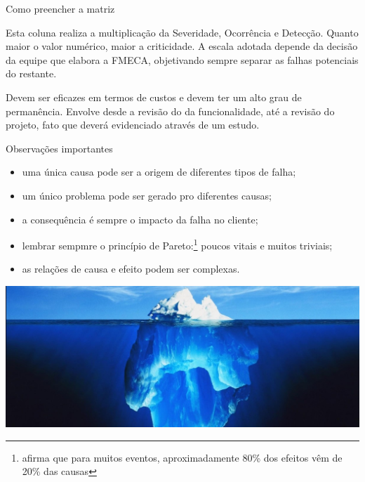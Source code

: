 \documentclass[aspectratio=169]{beamer}
\begin{document}
\begin{frame}[t]{Como preencher a matriz}
    \begin{description}[rightmargin=2em,style=nextline]
        \item [Criticidade:] Esta coluna realiza a multiplicação da Severidade, Ocorrência e Detecção. Quanto maior o valor numérico, maior a criticidade. A escala adotada depende da decisão da equipe que elabora a FMECA, objetivando sempre separar as falhas potenciais do restante. 
        \item [Ações recomendadas:] Devem ser eficazes em termos de custos e devem ter um alto grau de permanência. Envolve desde a revisão do da funcionalidade, até a revisão do projeto, fato que deverá evidenciado através de um estudo.
    \end{description}
\end{frame}
\begin{frame}[t]{Observações importantes}
    \begin{itemize}
        \item uma única causa pode ser a origem de diferentes tipos de falha;
        \item um único problema pode ser gerado pro diferentes causas;
        \item a consequência é sempre o impacto da falha no cliente;
        \item lembrar sempmre o princípio de Pareto:\footnote{afirma que para muitos eventos, aproximadamente 80\% dos efeitos vêm de 20\% das causas} poucos vitais e muitos triviais;
        \item as relações de causa e efeito podem ser complexas. 
    \end{itemize}
    \vspace{0.2cm}
    \includegraphics[width=1\textwidth, trim={0 6cm 0 0},clip]{iceberg}
\end{frame}
\end{document}
